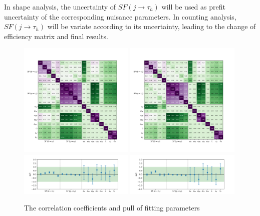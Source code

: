 In shape analysis, the
uncertainty of $SF (j \to \tau_h)$ will be used as prefit uncertainty of
the corresponding nuisance parameters.  In counting analysis, $SF (j \to
\tau_h)$ will be variate according to its uncertainty, leading to the
change of efficiency matrix and final results.




\begin{figure}
    \centering
    \includegraphics[width=0.49\textwidth]{chapters/Appendix/sectionJetToTauh/figures/corr2_lltauTight_splitJetFlavor.png}
    \includegraphics[width=0.49\textwidth]{chapters/Appendix/sectionJetToTauh/figures/corr2_lltauVTight_splitJetFlavor.png}
    \includegraphics[width=0.49\textwidth]{chapters/Appendix/sectionJetToTauh/figures/pull2_lltauTight_splitJetFlavor.png}
    \includegraphics[width=0.49\textwidth]{chapters/Appendix/sectionJetToTauh/figures/pull2_lltauVTight_splitJetFlavor.png}
    \caption{The correlation coefficients and pull of fitting parameters}
    \label{fig:appendix:fakeTauId:fitparam}
\end{figure}

